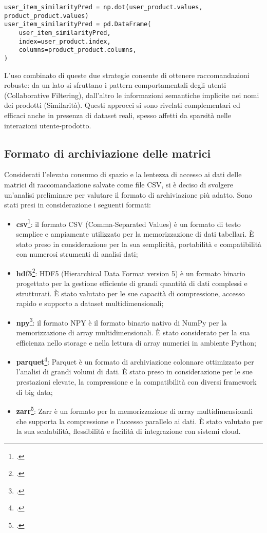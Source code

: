 \begin{lstlisting}
user_item_similarityPred = np.dot(user_product.values,
product_product.values)
user_item_similarityPred = pd.DataFrame(
    user_item_similarityPred,
    index=user_product.index,
    columns=product_product.columns,
)
\end{lstlisting}

\medskip

L’uso combinato di queste due strategie consente di ottenere raccomandazioni robuste: da un lato si sfruttano i pattern comportamentali degli utenti (Collaborative Filtering), dall’altro le informazioni semantiche implicite nei nomi dei prodotti (Similarità). Questi approcci si sono rivelati complementari ed efficaci anche in presenza di dataset reali, spesso affetti da sparsità nelle interazioni utente-prodotto.


\subsection{Formato di archiviazione delle matrici}

Considerati l'elevato consumo di spazio e la lentezza di accesso ai dati delle matrici di raccomandazione salvate come file CSV, si è deciso di svolgere un'analisi preliminare per valutare il formato di archiviazione più adatto. Sono stati presi in considerazione i seguenti formati:
\begin{itemize}
    \item \textbf{\gls{csv}}\footcite{site:csv}: il formato CSV (Comma-Separated Values) è un formato di testo semplice e ampiamente utilizzato per la memorizzazione di dati tabellari. È stato preso in considerazione per la sua semplicità, portabilità e compatibilità con numerosi strumenti di analisi dati;
    \item \textbf{\gls{hdf5}}\footcite{site:hdf5}: HDF5 (Hierarchical Data Format version 5) è un formato binario progettato per la gestione efficiente di grandi quantità di dati complessi e strutturati. È stato valutato per le sue capacità di compressione, accesso rapido e supporto a dataset multidimensionali;
    \item \textbf{\gls{npy}}\footcite{site:npy}: il formato NPY è il formato binario nativo di NumPy per la memorizzazione di array multidimensionali. È stato considerato per la sua efficienza nello storage e nella lettura di array numerici in ambiente Python;
    \item \textbf{\gls{parquet}}\footcite{site:parquet}: Parquet è un formato di archiviazione colonnare ottimizzato per l'analisi di grandi volumi di dati. È stato preso in considerazione per le sue prestazioni elevate, la compressione e la compatibilità con diversi framework di big data;
    \item \textbf{\gls{zarr}}\footcite{site:zarr}: Zarr è un formato per la memorizzazione di array multidimensionali che supporta la compressione e l'accesso parallelo ai dati. È stato valutato per la sua scalabilità, flessibilità e facilità di integrazione con sistemi cloud.
\end{itemize}

